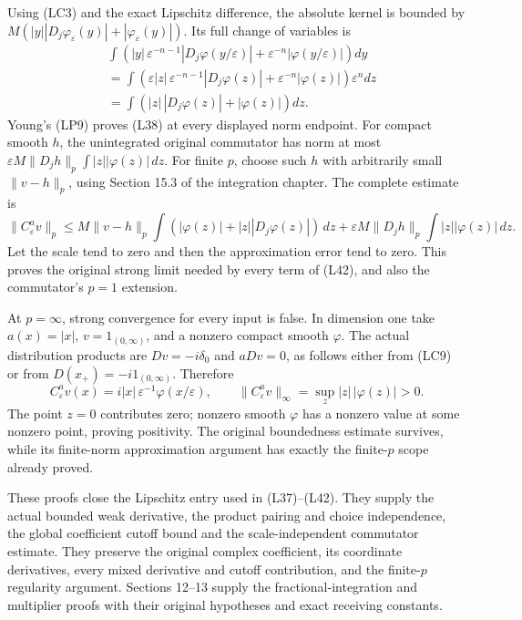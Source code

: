 \documentclass[
  11pt,
]{article}
\begin{document}
Using (LC3) and the exact Lipschitz difference, the absolute kernel is
bounded by
\(M(|y||D_j\varphi_\varepsilon(y)|+|\varphi_\varepsilon(y)|)\). Its full
change of variables is \[
 \begin{split}
 &\int\left(|y|\,\varepsilon^{-n-1}
                |D_j\varphi(y/\varepsilon)|
        +\varepsilon^{-n}|\varphi(y/\varepsilon)|\right)dy\\
 &=\int\left(\varepsilon|z|\,\varepsilon^{-n-1}|D_j\varphi(z)|
             +\varepsilon^{-n}|\varphi(z)|\right)\varepsilon^n dz\\
 &=\int\left(|z|\,|D_j\varphi(z)|+|\varphi(z)|\right)dz .
 \end{split}                                                   \tag{LC11}
\] Young's (LP9) proves (L38) at every displayed norm endpoint. For
compact smooth \(h\), the unintegrated original commutator has norm at
most \(\varepsilon M\|D_jh\|_p\int|z||\varphi(z)|\,dz\). For finite
\(p\), choose such \(h\) with arbitrarily small \(\|v-h\|_p\), using
Section 15.3 of the integration chapter. The complete estimate is \[
 \|C_\varepsilon^a v\|_p
 \leq M\|v-h\|_p\int
          (|\varphi(z)|+|z||D_j\varphi(z)|)\,dz
       +\varepsilon M\|D_jh\|_p\int|z||\varphi(z)|\,dz .
                                                               \tag{LC12}
\] Let the scale tend to zero and then the approximation error tend to
zero. This proves the original strong limit needed by every term of
(L42), and also the commutator's \(p=1\) extension.

At \(p=\infty\), strong convergence for every input is false. In
dimension one take \(a(x)=|x|\), \(v=1_{(0,\infty)}\), and a nonzero
compact smooth \(\varphi\). The actual distribution products are
\(D v=-i\delta_0\) and \(aD v=0\), as follows either from (LC9) or from
\(D(x_+)=-i1_{(0,\infty)}\). Therefore \[
 C_\varepsilon^a v(x)=i|x|\,\varepsilon^{-1}\varphi(x/\varepsilon),
 \qquad
 \|C_\varepsilon^a v\|_\infty
          =\sup_z |z|\,|\varphi(z)|>0 .                        \tag{LC13}
\] The point \(z=0\) contributes zero; nonzero smooth \(\varphi\) has a
nonzero value at some nonzero point, proving positivity. The original
boundedness estimate survives, while its finite-norm approximation
argument has exactly the finite-\(p\) scope already proved.

These proofs close the Lipschitz entry used in (L37)--(L42). They supply
the actual bounded weak derivative, the product pairing and choice
independence, the global coefficient cutoff bound and the
scale-independent commutator estimate. They preserve the original
complex coefficient, its coordinate derivatives, every mixed derivative
and cutoff contribution, and the finite-\(p\) regularity argument.
Sections 12--13 supply the fractional-integration and multiplier proofs
with their original hypotheses and exact receiving constants.
\end{document}
